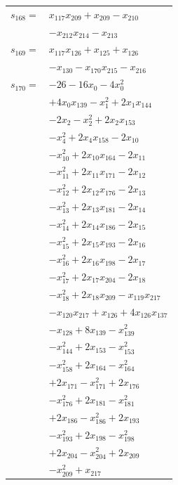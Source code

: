 \begin{longtable}{@{}r@{\;}l@{}}
\(s_{168}=\) & \(\displaystyle x_{117}x_{209} +x_{209} -x_{210}\) \\
 & \(\displaystyle -x_{212}x_{214} -x_{213}\) \\[3pt]
\(s_{169}=\) & \(\displaystyle x_{117}x_{126} +x_{125} +x_{126}\) \\
 & \(\displaystyle -x_{130} -x_{170}x_{215} -x_{216}\) \\[3pt]
\(s_{170}=\) & \(\displaystyle -26 -16x_{0} -4x_{0}^{2}\) \\
 & \(\displaystyle +4x_{0}x_{139} -x_{1}^{2} +2x_{1}x_{144}\) \\
 & \(\displaystyle -2x_{2} -x_{2}^{2} +2x_{2}x_{153}\) \\
 & \(\displaystyle -x_{4}^{2} +2x_{4}x_{158} -2x_{10}\) \\
 & \(\displaystyle -x_{10}^{2} +2x_{10}x_{164} -2x_{11}\) \\
 & \(\displaystyle -x_{11}^{2} +2x_{11}x_{171} -2x_{12}\) \\
 & \(\displaystyle -x_{12}^{2} +2x_{12}x_{176} -2x_{13}\) \\
 & \(\displaystyle -x_{13}^{2} +2x_{13}x_{181} -2x_{14}\) \\
 & \(\displaystyle -x_{14}^{2} +2x_{14}x_{186} -2x_{15}\) \\
 & \(\displaystyle -x_{15}^{2} +2x_{15}x_{193} -2x_{16}\) \\
 & \(\displaystyle -x_{16}^{2} +2x_{16}x_{198} -2x_{17}\) \\
 & \(\displaystyle -x_{17}^{2} +2x_{17}x_{204} -2x_{18}\) \\
 & \(\displaystyle -x_{18}^{2} +2x_{18}x_{209} -x_{119}x_{217}\) \\
 & \(\displaystyle -x_{120}x_{217} +x_{126} +4x_{126}x_{137}\) \\
 & \(\displaystyle -x_{128} +8x_{139} -x_{139}^{2}\) \\
 & \(\displaystyle -x_{144}^{2} +2x_{153} -x_{153}^{2}\) \\
 & \(\displaystyle -x_{158}^{2} +2x_{164} -x_{164}^{2}\) \\
 & \(\displaystyle +2x_{171} -x_{171}^{2} +2x_{176}\) \\
 & \(\displaystyle -x_{176}^{2} +2x_{181} -x_{181}^{2}\) \\
 & \(\displaystyle +2x_{186} -x_{186}^{2} +2x_{193}\) \\
 & \(\displaystyle -x_{193}^{2} +2x_{198} -x_{198}^{2}\) \\
 & \(\displaystyle +2x_{204} -x_{204}^{2} +2x_{209}\) \\
 & \(\displaystyle -x_{209}^{2} +x_{217}\) \\[3pt]
\end{longtable}
\endgroup
